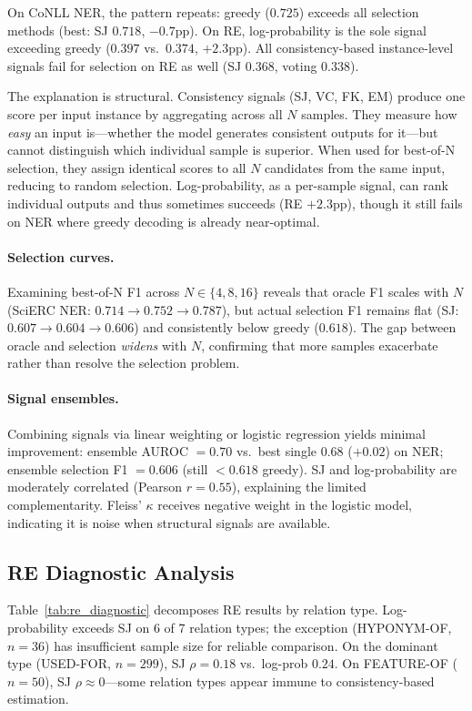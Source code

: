 \documentclass[11pt,a4paper]{article}
\begin{document}
On CoNLL NER, the pattern repeats: greedy ($0.725$) exceeds all selection methods (best: SJ $0.718$, $-0.7$pp). On RE, log-probability is the sole signal exceeding greedy ($0.397$ vs.\ $0.374$, $+2.3$pp). All consistency-based instance-level signals fail for selection on RE as well (SJ $0.368$, voting $0.338$).

The explanation is structural. Consistency signals (SJ, VC, FK, EM) produce one score per input instance by aggregating across all $N$ samples. They measure how \emph{easy} an input is---whether the model generates consistent outputs for it---but cannot distinguish which individual sample is superior. When used for best-of-N selection, they assign identical scores to all $N$ candidates from the same input, reducing to random selection. Log-probability, as a per-sample signal, can rank individual outputs and thus sometimes succeeds (RE $+2.3$pp), though it still fails on NER where greedy decoding is already near-optimal.

\paragraph{Selection curves.} Examining best-of-N F1 across $N \in \{4, 8, 16\}$ reveals that oracle F1 scales with $N$ (SciERC NER: $0.714 \to 0.752 \to 0.787$), but actual selection F1 remains flat (SJ: $0.607 \to 0.604 \to 0.606$) and consistently below greedy ($0.618$). The gap between oracle and selection \emph{widens} with $N$, confirming that more samples exacerbate rather than resolve the selection problem.

\paragraph{Signal ensembles.} Combining signals via linear weighting or logistic regression yields minimal improvement: ensemble AUROC $= 0.70$ vs.\ best single $0.68$ ($+0.02$) on NER; ensemble selection F1 $= 0.606$ (still $< 0.618$ greedy). SJ and log-probability are moderately correlated (Pearson $r = 0.55$), explaining the limited complementarity. Fleiss' $\kappa$ receives negative weight in the logistic model, indicating it is noise when structural signals are available.

\subsection{RE Diagnostic Analysis}
\label{sec:re_diagnostic}

Table~\ref{tab:re_diagnostic} decomposes RE results by relation type. Log-probability exceeds SJ on 6 of 7 relation types; the exception (HYPONYM-OF, $n=36$) has insufficient sample size for reliable comparison. On the dominant type (USED-FOR, $n=299$), SJ $\rho = 0.18$ vs.\ log-prob $0.24$. On FEATURE-OF ($n=50$), SJ $\rho \approx 0$---some relation types appear immune to consistency-based estimation.
\end{document}
